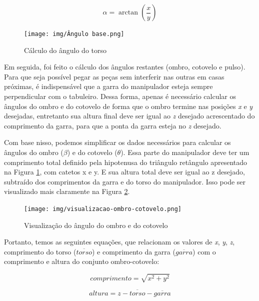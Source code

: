 \begin{dmath}
\label{eq:anguloTorso}
    \alpha = \arctan\left(\frac{x}{y}\right)
\end{dmath}

\begin{figure}[H]
    \centering
    \caption{Cálculo do ângulo do torso}
    \texttt{[image: img/Ângulo base.png]}
    \label{fig:calculoAnguloTorso}
\end{figure}

Em seguida, foi feito o cálculo dos ângulos restantes (ombro, cotovelo e pulso).
Para que seja possível pegar as peças sem interferir nas outras em casas próximas, é indispensável que a garra do manipulador esteja sempre perpendicular com o tabuleiro.
Dessa forma, apenas é necessário calcular os ângulos do ombro e do cotovelo de forma que o ombro termine nas posições \textit{x} e \textit{y} desejadas,
entretanto sua altura final deve ser igual ao \textit{z} desejado acrescentado do comprimento da garra, para que a ponta da garra esteja no \textit{z} desejado.

Com base nisso, podemos simplificar os dados necessários para calcular os ângulos do ombro ($\beta$) e do cotovelo ($\theta$).
Essa parte do manipulador deve ter um comprimento total definido pela hipotenusa do triângulo retângulo apresentado na Figura \ref{fig:calculoAnguloTorso}, com catetos x e y.
E sua altura total deve ser igual ao z desejado, subtraído dos comprimentos da garra e do torso do manipulador.
Isso pode ser visualizado mais claramente na Figura \ref{fig:visualizacaoAnguloOmbroCotovelo}.

\begin{figure}[H]
    \centering
    \caption{Visualização do ângulo do ombro e do cotovelo}
    \texttt{[image: img/visualizacao-ombro-cotovelo.png]}
    \label{fig:visualizacaoAnguloOmbroCotovelo}
\end{figure}

Portanto, temos as seguintes equações, que relacionam os valores de \textit{x}, \textit{y}, \textit{z}, comprimento do torso ($\overline{torso}$) e comprimento da garra ($\overline{garra}$) com o comprimento e altura do conjunto ombro-cotovelo:

\begin{dmath}
\label{eq:comprimentoOmbroCotovelo}
    comprimento = \sqrt{x^2 + y^2}
\end{dmath}

\begin{dmath}
\label{eq:alturaOmbroCotovelo}
    altura = z - \overline{torso} - \overline{garra}
\end{dmath}

